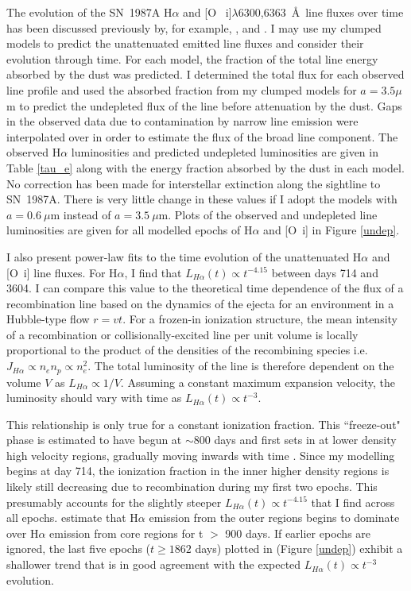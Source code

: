 The evolution of the SN~1987A H$\alpha$ and [O~{\sc 
i}]$\lambda$6300,6363~\AA\ line fluxes over time has been discussed 
previously by, for example, \citet{Li1992}, \citet{Xu1992} and 
\citet{Kozma1998b}. I may use my clumped models to predict the 
unattenuated 
emitted line fluxes and consider their evolution through time.  For each 
model, the fraction of the total line energy absorbed by the dust was 
predicted.  I determined the total flux for each observed line profile 
and used the absorbed fraction from my clumped models for $a=3.5\mu$m to 
predict the undepleted flux of the line before attenuation by the dust.  
Gaps in the observed data due to contamination by narrow line emission 
were interpolated over in order to estimate the flux of the broad line 
component. The observed H$\alpha$ luminosities and predicted undepleted 
luminosities are given in Table \ref{tau_e} along with the energy fraction 
absorbed by the dust in each model. No correction has been made for 
interstellar extinction along the sightline to SN~1987A.
There is very little change in 
these values if I adopt the models with $a=0.6~\mu$m instead of 
$a=3.5~\mu$m.  Plots of the observed and undepleted line luminosities are 
given for all modelled epochs of H$\alpha$ and [O~{\sc i}] in Figure 
\ref{undep}.




I also present power-law fits to the time evolution of the unattenuated 
H$\alpha$ and [O~{\sc i}] line fluxes.  For H$\alpha$, I find that 
$L_{H\alpha}(t) \propto t^{-4.15}$ between days 714 and 3604.  I can 
compare this value to the theoretical time dependence of the flux of a 
recombination line based on the dynamics of the ejecta for an 
environment in a Hubble-type flow $r=vt$.  For a frozen-in ionization 
structure, the mean intensity of a recombination or collisionally-excited 
line per unit volume is locally proportional to the product of the 
densities of the recombining species i.e. $J_{H\alpha} \propto n_e n_p 
\propto n_e^2$.  The total luminosity of the line is therefore dependent 
on the volume $V$ as $L_{H\alpha} \propto 1/V $.  Assuming a constant 
maximum expansion velocity, the luminosity should vary with time as 
$L_{H\alpha}(t) \propto t^{-3}$.

This relationship is only true for a constant ionization fraction.  This 
``freeze-out" phase is estimated to have begun at $\sim 800$ days and 
first sets in at lower density high velocity regions, gradually moving 
inwards with time \citep{Danziger1991,Fransson1993}.  Since my modelling 
begins at day 714, the ionization fraction in the inner higher density 
regions is likely still decreasing due to recombination during my first 
two epochs.  This presumably accounts for the slightly steeper 
$L_{H\alpha}(t) \propto t^{-4.15}$ that I find across all epochs.  
\citet{Kozma1998b} estimate that H$\alpha$ emission from the outer regions 
begins to dominate over H$\alpha$ emission from core regions for t $>$ 
900 days. If earlier epochs are ignored, the last five epochs ($t \ge 
1862$ days) plotted in (Figure \ref{undep}) exhibit a shallower trend that 
is in good agreement with the expected $L_{H\alpha}(t) \propto t^{-3}$ 
evolution.

